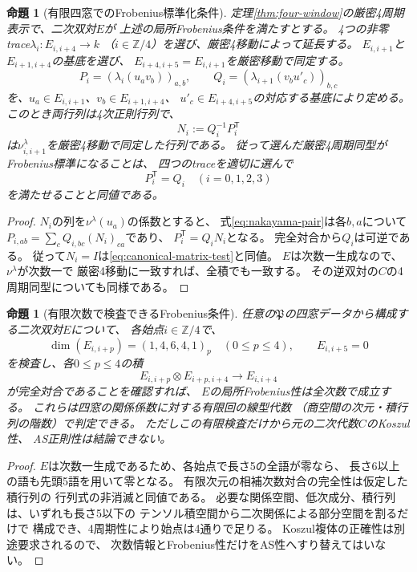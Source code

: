 \documentclass[11pt,a4paper]{ltjsarticle}
\newtheorem{proposition}[theorem]{命題}
\theoremstyle{definition}
\begin{document}
\begin{proposition}[有限四窓でのFrobenius標準化条件]\label{prop:canonical-matrix}
定理\ref{thm:four-window}の厳密4周期表示で、二次双対$E$が
上述の局所Frobenius条件を満たすとする。
4つの非零trace$\lambda_i:E_{i,i+4}\to k$
（$i\in\mathbb Z/4$）を選び、厳密4移動によって延長する。
$E_{i,i+1}$と$E_{i+1,i+4}$の基底を選び、
$E_{i+4,i+5}=E_{i,i+1}$を厳密移動で同定する。
\[
 P_i=(\lambda_i(u_a v_b))_{a,b},\qquad
 Q_i=(\lambda_{i+1}(v_b u'_c))_{b,c}
\]
を、$u_a\in E_{i,i+1}$、$v_b\in E_{i+1,i+4}$、
$u'_c\in E_{i+4,i+5}$の対応する基底により定める。
このとき両行列は4次正則行列で、
\[
 N_i:=Q_i^{-1}P_i^{\mathsf T}
\]
は$\nu^\lambda_{i,i+1}$を厳密4移動で同定した行列である。
従って選んだ厳密4周期同型がFrobenius標準になることは、
\emph{四つのtraceを適切に選んで}
\begin{equation}\label{eq:canonical-matrix-test}
 P_i^{\mathsf T}=Q_i\quad(i=0,1,2,3)
\end{equation}
を満たせることと同値である。
\end{proposition}
\begin{proof}
$N_i$の列を$\nu^\lambda(u_a)$の係数とすると、
式\eqref{eq:nakayama-pair}は各$b,a$について
$P_{i,ab}=\sum_c Q_{i,bc}(N_i)_{ca}$であり、
$P_i^{\mathsf T}=Q_iN_i$となる。
完全対合から$Q_i$は可逆である。
従って$N_i=I$は\eqref{eq:canonical-matrix-test}と同値。
$E$は次数一生成なので、$\nu^\lambda$が次数一で
厳密4移動に一致すれば、全積でも一致する。
その逆双対の$C$の4周期同型についても同様である。
\end{proof}

\begin{proposition}[有限次数で検査できるFrobenius条件]\label{prop:finite-frobenius}
任意の$\mathfrak P$の四窓データから構成する二次双対$E$について、
各始点$i\in\mathbb Z/4$で、
\[
 \dim(E_{i,i+p})=(1,4,6,4,1)_p\quad(0\le p\le4),
 \qquad E_{i,i+5}=0
\]
を検査し、各$0\le p\le4$の積
\[
 E_{i,i+p}\otimes E_{i+p,i+4}\longrightarrow E_{i,i+4}
\]
が完全対合であることを確認すれば、
$E$の局所Frobenius性は全次数で成立する。
これらは四窓の関係係数に対する\emph{有限回の線型代数}
（商空間の次元・積行列の階数）で判定できる。
ただしこの有限検査\emph{だけ}から元の二次代数$C$のKoszul性、
AS正則性は結論できない。
\end{proposition}
\begin{proof}
$E$は次数一生成であるため、各始点で長さ5の全語が零なら、
長さ6以上の語も先頭5語を用いて零となる。
有限次元の相補次数対合の完全性は仮定した積行列の
行列式の非消滅と同値である。
必要な関係空間、低次成分、積行列は、いずれも長さ5以下の
テンソル積空間から二次関係による部分空間を割るだけで
構成でき、4周期性により始点は4通りで足りる。
Koszul複体の正確性は別途要求されるので、
次数情報とFrobenius性だけをAS性へすり替えてはいない。
\end{proof}
\end{document}
